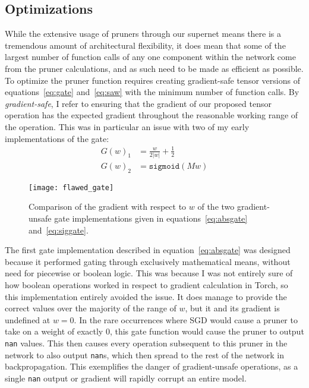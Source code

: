 
\graphicspath{{Chapters/appendix_bonsai/figures/}}

\subsection{Optimizations}
While the extensive usage of pruners through our supernet means there is a tremendous amount of architectural flexibility,
it does mean that some of the largest number of function calls of any one component within the network come from the pruner
calculations, and as such need to be made as efficient as possible. To optimize the pruner function requires
creating gradient-safe tensor versions of equations~\ref{eq:gate} and~\ref{eq:saw} with the minimum number of function calls.
By \textit{gradient-safe}, I refer to ensuring that the gradient of our proposed tensor operation has the expected gradient
throughout the reasonable working range of the operation.  This was in particular an issue with two of my early
implementations of the gate:
\begin{align}
	G(w)_1 &=  \frac{w}{2|w|} + \frac{1}{2} \label{eq:absgate}\\
	G(w)_2 &= \texttt{sigmoid}(Mw)  \label{eq:siggate}
\end{align}

\begin{figure}[ht]
	\centering
	\texttt{[image: flawed\_gate]}
	\caption{Comparison of the gradient with respect to $w$ of the two gradient-unsafe gate implementations given in
	equations~\ref{eq:absgate} and~\ref{eq:siggate}.}
	\label{fig:badgates}
\end{figure}

The first gate implementation described in equation~\ref{eq:absgate} was designed because it performed gating through
exclusively mathematical means, without need for piecewise or boolean logic. This was because I was not entirely sure of
how boolean operations
worked in respect to gradient calculation in Torch, so this implementation entirely avoided the issue. It does manage
to provide the correct values over the majority of the range of $w$, but it and its gradient is undefined at $w=0$.
In the rare occurrences where SGD would cause a pruner to take on a weight of exactly 0, this gate function would cause
the pruner to output \texttt{nan} values. This then causes every operation subsequent to this pruner in the network to also
output \texttt{nan}s, which then spread to the rest of the network in backpropagation. This exemplifies the danger of gradient-unsafe operations, as a single \texttt{nan} output or gradient
will rapidly corrupt an entire model.

